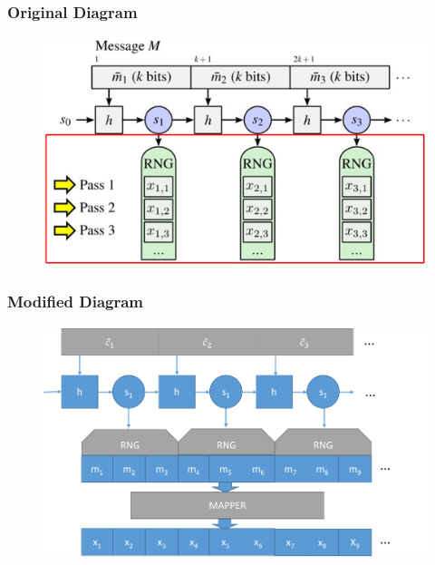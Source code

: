 \documentclass{beamer}
\begin{document}

\begin{frame}
\frametitle{Original Diagram}
\begin{figure}
\includegraphics[width=0.9\linewidth]{diagram1_1.eps}
\end{figure}
\end{frame}

\begin{frame}
\frametitle{Modified Diagram}
\begin{figure}
\includegraphics[width=0.8\linewidth]{figencode.pdf}
\end{figure}
\end{frame}

\end{document}
